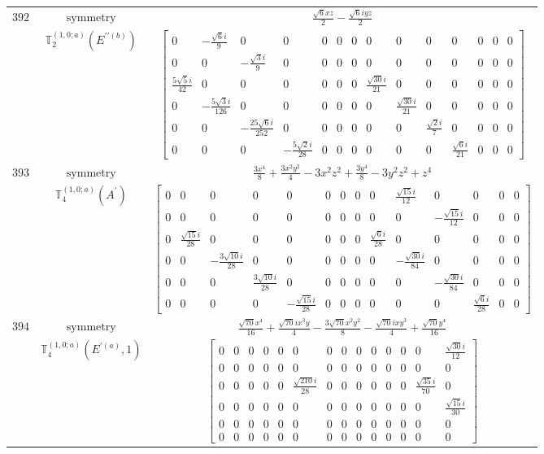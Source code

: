 \documentclass[fleqn,8pt,landscape]{jsarticle}
\begin{document}
\begin{longtable}{ccc}
$ 392 $ & $ \text{symmetry} $ & $ \frac{\sqrt{6} x z}{2} - \frac{\sqrt{6} i y z}{2} $ \\
$  $ & $ \mathbb{T}_{2}^{(1,0;a)}(E^{\prime\prime(b)}) $ & $ \begin{bmatrix} 0 & - \frac{\sqrt{6} i}{9} & 0 & 0 & 0 & 0 & 0 & 0 & 0 & 0 & 0 & 0 & 0 & 0 \\ 0 & 0 & - \frac{\sqrt{3} i}{9} & 0 & 0 & 0 & 0 & 0 & 0 & 0 & 0 & 0 & 0 & 0 \\ \frac{5 \sqrt{5} i}{42} & 0 & 0 & 0 & 0 & 0 & 0 & \frac{\sqrt{30} i}{21} & 0 & 0 & 0 & 0 & 0 & 0 \\ 0 & - \frac{5 \sqrt{3} i}{126} & 0 & 0 & 0 & 0 & 0 & 0 & \frac{\sqrt{30} i}{21} & 0 & 0 & 0 & 0 & 0 \\ 0 & 0 & - \frac{25 \sqrt{6} i}{252} & 0 & 0 & 0 & 0 & 0 & 0 & \frac{\sqrt{2} i}{7} & 0 & 0 & 0 & 0 \\ 0 & 0 & 0 & - \frac{5 \sqrt{2} i}{28} & 0 & 0 & 0 & 0 & 0 & 0 & \frac{\sqrt{6} i}{21} & 0 & 0 & 0 \end{bmatrix} $ \\ \hline
$ 393 $ & $ \text{symmetry} $ & $ \frac{3 x^{4}}{8} + \frac{3 x^{2} y^{2}}{4} - 3 x^{2} z^{2} + \frac{3 y^{4}}{8} - 3 y^{2} z^{2} + z^{4} $ \\
$  $ & $ \mathbb{T}_{4}^{(1,0;a)}(A^{\prime}) $ & $ \begin{bmatrix} 0 & 0 & 0 & 0 & 0 & 0 & 0 & 0 & 0 & \frac{\sqrt{15} i}{12} & 0 & 0 & 0 & 0 \\ 0 & 0 & 0 & 0 & 0 & 0 & 0 & 0 & 0 & 0 & - \frac{\sqrt{15} i}{12} & 0 & 0 & 0 \\ 0 & \frac{\sqrt{15} i}{28} & 0 & 0 & 0 & 0 & 0 & 0 & \frac{\sqrt{6} i}{28} & 0 & 0 & 0 & 0 & 0 \\ 0 & 0 & - \frac{3 \sqrt{10} i}{28} & 0 & 0 & 0 & 0 & 0 & 0 & - \frac{\sqrt{30} i}{84} & 0 & 0 & 0 & 0 \\ 0 & 0 & 0 & \frac{3 \sqrt{10} i}{28} & 0 & 0 & 0 & 0 & 0 & 0 & - \frac{\sqrt{30} i}{84} & 0 & 0 & 0 \\ 0 & 0 & 0 & 0 & - \frac{\sqrt{15} i}{28} & 0 & 0 & 0 & 0 & 0 & 0 & \frac{\sqrt{6} i}{28} & 0 & 0 \end{bmatrix} $ \\ \hline
$ 394 $ & $ \text{symmetry} $ & $ \frac{\sqrt{70} x^{4}}{16} + \frac{\sqrt{70} i x^{3} y}{4} - \frac{3 \sqrt{70} x^{2} y^{2}}{8} - \frac{\sqrt{70} i x y^{3}}{4} + \frac{\sqrt{70} y^{4}}{16} $ \\
$  $ & $ \mathbb{T}_{4}^{(1,0;a)}(E^{\prime(a)},1) $ & $ \begin{bmatrix} 0 & 0 & 0 & 0 & 0 & 0 & 0 & 0 & 0 & 0 & 0 & 0 & 0 & \frac{\sqrt{30} i}{12} \\ 0 & 0 & 0 & 0 & 0 & 0 & 0 & 0 & 0 & 0 & 0 & 0 & 0 & 0 \\ 0 & 0 & 0 & 0 & 0 & \frac{\sqrt{210} i}{28} & 0 & 0 & 0 & 0 & 0 & 0 & \frac{\sqrt{35} i}{70} & 0 \\ 0 & 0 & 0 & 0 & 0 & 0 & 0 & 0 & 0 & 0 & 0 & 0 & 0 & \frac{\sqrt{15} i}{30} \\ 0 & 0 & 0 & 0 & 0 & 0 & 0 & 0 & 0 & 0 & 0 & 0 & 0 & 0 \\ 0 & 0 & 0 & 0 & 0 & 0 & 0 & 0 & 0 & 0 & 0 & 0 & 0 & 0 \end{bmatrix} $ \\ \hline

\end{longtable}
\end{document}
